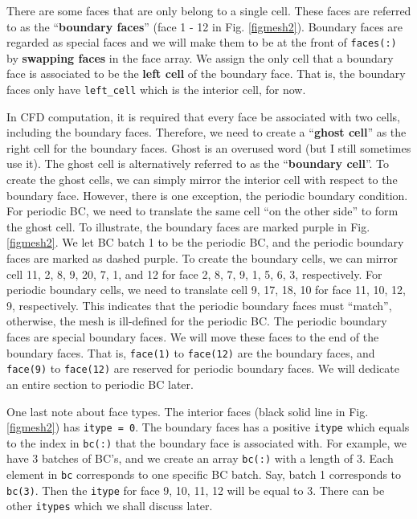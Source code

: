 \documentclass[12pt, letterpaper]{report}
\begin{document}
There are some faces that are only belong to a single cell. These faces are referred to as the
``{\bf boundary faces}'' (face 1 - 12 in Fig. \ref{figmesh2}). Boundary faces are regarded as
special faces and we will make them to be at the front of \verb+faces(:)+ by {\bf swapping faces} in the
face array. We assign the only cell
that a boundary face is associated to be the {\bf left cell} of the boundary face. That is, the
boundary faces only have \verb+left_cell+ which is the interior cell, for now.
\paraspace

In CFD computation, it is required that every face be associated with two cells, including the
boundary faces. Therefore, we need to create a ``{\bf ghost cell}'' as the right cell for the
boundary faces. Ghost is an overused word (but I still sometimes use it). The ghost cell is
alternatively referred to as the ``{\bf boundary cell}''. To create the ghost cells, we can simply
mirror the interior cell with respect to the boundary face. However, there is one exception, the
periodic boundary condition. For periodic BC, we need to translate the same cell ``on the other
side'' to form the ghost cell. To illustrate, the boundary faces are marked purple in Fig.
\ref{figmesh2}. We let BC batch 1 to be the periodic BC, and the periodic boundary faces are marked
as dashed purple. To create the boundary cells, we can mirror cell 11, 2, 8, 9, 20, 7, 1, and 12 for
face 2, 8, 7, 9, 1, 5, 6,  3, respectively. For periodic boundary cells, we need to translate cell
9, 17, 18, 10 for face 11, 10, 12, 9, respectively. This indicates that the periodic boundary faces
must ``match'', otherwise, the mesh is ill-defined for the periodic BC. The periodic boundary faces
are special boundary faces. We will move these faces to the end of the boundary faces. That is,
\verb+face(1)+ to \verb+face(12)+ are the boundary faces, and \verb+face(9)+ to \verb+face(12)+ are
reserved for periodic boundary faces.  We will dedicate an entire section to periodic BC later.
\paraspace

One last note about face types. The interior faces (black solid line in Fig. \ref{figmesh2}) has
\verb+itype = 0+. The boundary faces has a positive \verb+itype+ which equals to the index in
\verb+bc(:)+ that the boundary face is associated with. For example, we have 3 batches of BC's, and
we create an array \verb+bc(:)+ with a length of 3. Each element in \verb+bc+ corresponds to one
specific BC batch. Say, batch 1 corresponds to \verb+bc(3)+. Then the \verb+itype+ for face 9, 10, 11,
12 will be equal to 3. There can be other \verb+itypes+ which we shall discuss later.
\paraspace
\end{document}
